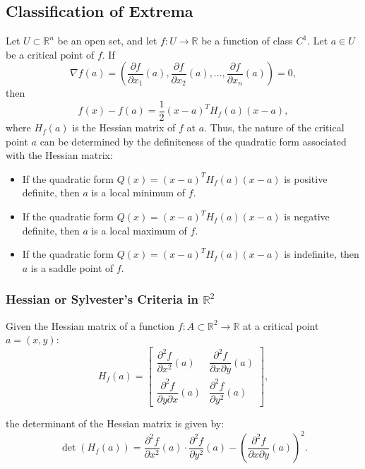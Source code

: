 \documentclass[11pt]{article}
\begin{document}
\subsection{Classification of Extrema}
Let \(U \subset \mathbb{R}^n\) be an open set, and let \(f : U \to \mathbb{R}\) be a function of class \(C^1\). Let \(a \in U\) be a critical point of \(f\). If
\[\nabla f(a) = \left( \frac{\partial f}{\partial x_1}(a), \frac{\partial f}{\partial x_2}(a), \ldots, \frac{\partial f}{\partial x_n}(a) \right) = 0,\]
then 
\[ f(x) - f(a) = \frac{1}{2} (x - a)^T H_f(a) (x - a), \]
where \(H_f(a)\) is the Hessian matrix of \(f\) at \(a\). Thus, the nature of the critical point \(a\) can be determined by the definiteness of the quadratic form associated with the Hessian matrix:
\begin{itemize}
    \item If the quadratic form \(Q(x) = (x - a)^T H_f(a) (x - a)\) is positive definite, then \(a\) is a local minimum of \(f\).
    \item If the quadratic form \(Q(x) = (x - a)^T H_f(a) (x - a)\) is negative definite, then \(a\) is a local maximum of \(f\).
    \item If the quadratic form \(Q(x) = (x - a)^T H_f(a) (x - a)\) is indefinite, then \(a\) is a saddle point of \(f\).
\end{itemize}

\subsubsection{Hessian or Sylvester's Criteria in \(\mathbb{R}^2\)}
Given the Hessian matrix of a function \(f : A \subset \mathbb{R}^2 \to \mathbb{R}\) at a critical point \(a = (x, y)\):
\[H_f(a) = \begin{bmatrix}
\dfrac{\partial^2 f}{\partial x^2}(a) & \dfrac{\partial^2 f}{\partial x \partial y}(a) \\
\dfrac{\partial^2 f}{\partial y \partial x}(a) & \dfrac{\partial^2 f}{\partial y^2}(a)
\end{bmatrix},\]

the determinant of the Hessian matrix is given by:
\[\det(H_f(a)) = \frac{\partial^2 f}{\partial x^2}(a) \cdot \frac{\partial^2 f}{\partial y^2}(a) - \left( \frac{\partial^2 f}{\partial x \partial y}(a) \right)^2.\]

\pagebreak
\end{document}
